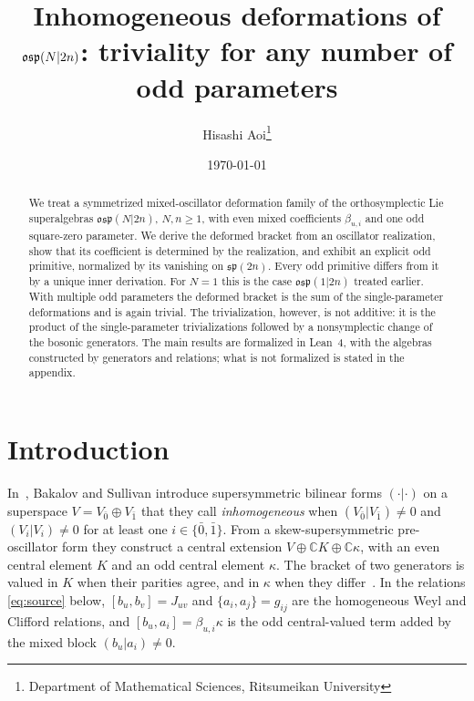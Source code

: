 \documentclass[11pt]{article}
\title{Inhomogeneous deformations of $\osp(N|2n)$: triviality for any number of odd
parameters}
\author{Hisashi Aoi\thanks{Department of Mathematical Sciences, Ritsumeikan University}}
\date{\today}
\numberwithin{equation}{section}
\theoremstyle{definition}
\theoremstyle{remark}
\newcommand{\osp}{\mathfrak{osp}}
\begin{document}
\maketitle

\begin{abstract}
We treat a symmetrized mixed-oscillator deformation family of the
orthosymplectic Lie superalgebras $\osp(N|2n)$, $N,n\geq1$, with even mixed
coefficients $\beta_{u,i}$ and one odd square-zero parameter. We derive the deformed
bracket from an oscillator realization, show that its coefficient is determined by the
realization, and exhibit an explicit odd primitive, normalized by its vanishing on
$\mathfrak{sp}(2n)$. Every odd primitive differs from it by a unique inner derivation.
For $N=1$ this is the case $\osp(1|2n)$ treated earlier. With multiple odd parameters
the deformed bracket is the sum of the single-parameter deformations and is again
trivial. The trivialization, however, is not additive: it is the product of the
single-parameter trivializations followed by a nonsymplectic change of the bosonic
generators. The main results are formalized in Lean~4, with the algebras constructed by
generators and relations; what is not formalized is stated in the appendix.
\end{abstract}

\section{Introduction}\label{sec:introduction}

In~\cite{BS17}, Bakalov and Sullivan introduce supersymmetric bilinear forms
$(\cdot|\cdot)$ on a superspace $V=V_{\bar0}\oplus V_{\bar1}$ that they call
\emph{inhomogeneous} when $(V_{\bar0}|V_{\bar1})\neq0$ and $(V_i|V_i)\neq0$ for at
least one $i\in\{\bar0,\bar1\}$. From a skew-supersymmetric pre-oscillator form they
construct a central extension $V\oplus\mathbb CK\oplus\mathbb C\kappa$, with an even
central element $K$ and an odd central element $\kappa$. The bracket of two generators is
valued in $K$ when their parities agree, and in $\kappa$ when they differ~\cite[Section~4]{BS17}. In the relations \eqref{eq:source} below,
$[b_u,b_v]=J_{uv}$ and $\{a_i,a_j\}=g_{ij}$ are the homogeneous Weyl and Clifford
relations, and $[b_u,a_i]=\beta_{u,i}\kappa$ is the odd central-valued term added by
the mixed block $(b_u|a_i)\neq0$.
\end{document}
